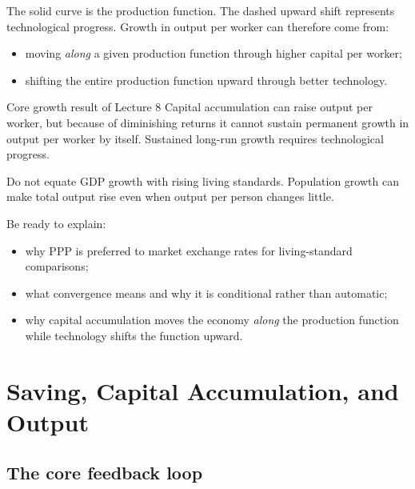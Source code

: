 \documentclass[12pt]{article}
\begin{document}
The solid curve is the production function. The dashed upward shift represents technological progress. Growth in output per worker can therefore come from:
\begin{itemize}[leftmargin=1.5em]
\item moving \emph{along} a given production function through higher capital per worker;
\item shifting the entire production function upward through better technology.
\end{itemize}

\begin{theorem}{Core growth result of Lecture 8}{}
Capital accumulation can raise output per worker, but because of diminishing returns it cannot sustain permanent growth in output per worker by itself. Sustained long-run growth requires technological progress.
\end{theorem}

\begin{commonmistake}
Do not equate GDP growth with rising living standards. Population growth can make total output rise even when output per person changes little.
\end{commonmistake}

\begin{examtip}[title={Exam Focus: What to prioritise from Chapter 8}]
Be ready to explain:
\begin{itemize}[leftmargin=1.5em]
\item why PPP is preferred to market exchange rates for living-standard comparisons;
\item what convergence means and why it is conditional rather than automatic;
\item why capital accumulation moves the economy \emph{along} the production function while technology shifts the function upward.
\end{itemize}
\end{examtip}

\newpage
\section{Saving, Capital Accumulation, and Output}

\subsection{The core feedback loop}
\end{document}
